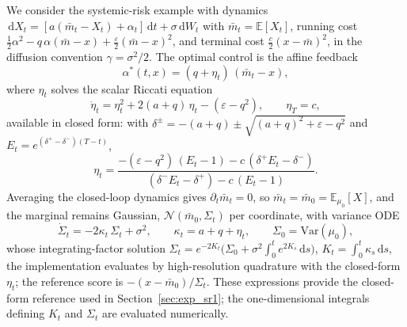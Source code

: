 \documentclass[preprint]{elsarticle}
\newcommand{\dd}{\,\mathrm{d}}          %
\newcommand{\E}{\mathbb{E}}
\newcommand{\g}{\gamma}
\newcommand{\sN}{\mathcal{N}}
\begin{document}
We consider the systemic-risk example with dynamics 
$\dd X_t=[a(\bar m_t-X_t)+\alpha_t]\dd t+\sigma\dd W_t$
with $\bar m_t=\E[X_t]$, running cost 
$\tfrac12\alpha^2-q\,\alpha(\bar m-x)+\tfrac{\varepsilon}{2}(\bar m-x)^2$, 
and terminal cost $\tfrac{c}{2}(x-\bar m)^2$, in the diffusion convention $\g=\sigma^2/2$. The optimal control is the affine feedback
\[
\alpha^*(t,x) = (q+\eta_t)\,(\bar m_t - x),
\]
where $\eta_t$ solves the scalar Riccati equation
\[
\dot\eta_t = \eta_t^2 + 2(a+q)\,\eta_t - (\varepsilon - q^2),
\qquad \eta_T = c,
\]
available in closed form: with 
$\delta^{\pm}=-(a+q)\pm\sqrt{(a+q)^2+\varepsilon-q^2}$ 
and 
$E_t=e^{(\delta^+-\delta^-)(T-t)}$,
\[
\eta_t
= \frac{-(\varepsilon-q^2)\,(E_t-1) - c\,(\delta^+E_t-\delta^-)}
{(\delta^-E_t-\delta^+) - c\,(E_t-1)}.
\]
Averaging the closed-loop dynamics gives
$\partial_t\bar m_t=0$, so $\bar m_t=\bar m_0=\E_{\mu_0}[X]$, and the marginal remains Gaussian, $\sN(\bar m_0,\Sigma_t)$ per coordinate, with variance ODE
\[
\dot\Sigma_t = -2\kappa_t\,\Sigma_t + \sigma^2,
\qquad \kappa_t = a+q+\eta_t,
\qquad \Sigma_0 = \mathrm{Var}(\mu_0),
\]
whose integrating-factor solution $\Sigma_t = e^{-2K_t}\bigl(\Sigma_0+\sigma^2\int_0^t e^{2K_s}\dd s\bigr)$, $K_t=\int_0^t\kappa_s\dd s$, the implementation evaluates by high-resolution quadrature with the closed-form $\eta_t$; the reference score is $-(x-\bar m_0)/\Sigma_t$. These expressions provide the closed-form reference used in Section~\ref{sec:exp_sr1}; the one-dimensional integrals defining \(K_t\) and \(\Sigma_t\) are evaluated numerically.
\end{document}
